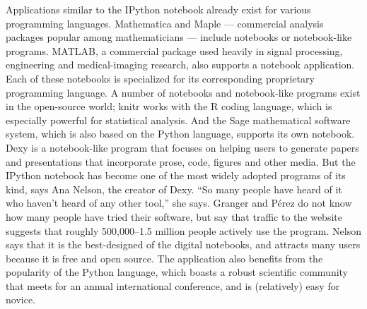Applications similar to the IPython notebook
already exist for various programming
languages. Mathematica and Maple — commercial
analysis packages popular among mathematicians
— include notebooks or notebook-like
programs. MATLAB, a commercial package
used heavily in signal processing, engineering
and medical-imaging research, also supports a
notebook application. Each of these notebooks
is specialized for its corresponding proprietary
programming language.
A number of notebooks and notebook-like
programs exist in the open-source world; knitr
works with the R coding language, which is
especially powerful for statistical analysis. And
the Sage mathematical software system, which
is also based on the Python language, supports
its own notebook. Dexy is a notebook-like program
that focuses on helping users to generate
papers and presentations that incorporate prose,
code, figures and other media.
But the IPython notebook has become one
of the most widely adopted programs of its
kind, says Ana Nelson, the creator of Dexy. “So
many people have heard of it who haven’t heard
of any other tool,” she says. Granger and Pérez
do not know how many people have tried their
software, but say that traffic to the website suggests
that roughly 500,000–1.5 million people
actively use the program. Nelson says that it is
the best-designed of the digital notebooks, and
attracts many users because it is free and open
source. The application also benefits from the
popularity of the Python language, which boasts
a robust scientific community that meets for an
annual international conference, and is (relatively)
easy for novice.